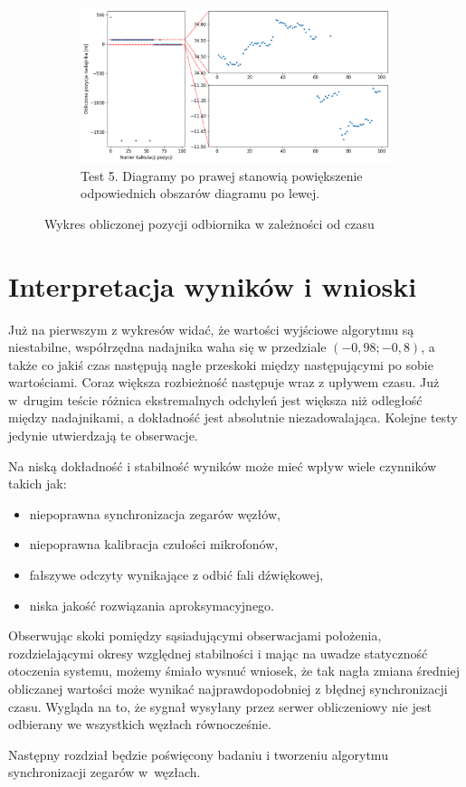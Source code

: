 \begin{figure}[H]
    \ContinuedFloat\centering
    \begin{subfigure}{\textwidth}\label{fig:position_4}
        \centering
        \includegraphics[width=0.95\linewidth]{pics/position/position_4.png}
        \caption{Test 5. Diagramy po prawej stanowią powiększenie odpowiednich obszarów diagramu po lewej.}
    \end{subfigure}
    \caption{Wykres obliczonej pozycji odbiornika w zależności od czasu}
    \label{fig:position}
\end{figure}

\section{Interpretacja wyników i wnioski}

Już na pierwszym z wykresów widać, że wartości wyjściowe algorytmu są niestabilne, współrzędna nadajnika waha się w przedziale $(-0,98; -0,8)$, a także co jakiś czas następują nagłe przeskoki między następującymi po sobie wartościami. Coraz większa rozbieżność następuje wraz z upływem czasu. Już w~drugim teście różnica ekstremalnych odchyleń jest większa niż odległość między nadajnikami, a dokładność jest absolutnie niezadowalająca. Kolejne testy jedynie utwierdzają te obserwacje.

Na niską dokładność i stabilność wyników może mieć wpływ wiele czynników takich jak:

\begin{itemize}
    \item niepoprawna synchronizacja zegarów węzłów,
    \item niepoprawna kalibracja czułości mikrofonów,
    \item fałszywe odczyty wynikające z odbić fali dźwiękowej,
    \item niska jakość rozwiązania aproksymacyjnego.
\end{itemize}

Obserwując skoki pomiędzy sąsiadującymi obserwacjami położenia, rozdzielającymi okresy względnej stabilności i mając na uwadze statyczność otoczenia systemu, możemy śmiało wysnuć wniosek, że tak nagła zmiana średniej obliczanej wartości może wynikać najprawdopodobniej z błędnej synchronizacji czasu. Wygląda na to, że sygnał wysyłany przez serwer obliczeniowy nie jest odbierany we wszystkich węzłach równocześnie. 

Następny rozdział będzie poświęcony badaniu i tworzeniu algorytmu synchronizacji zegarów w~węzłach.